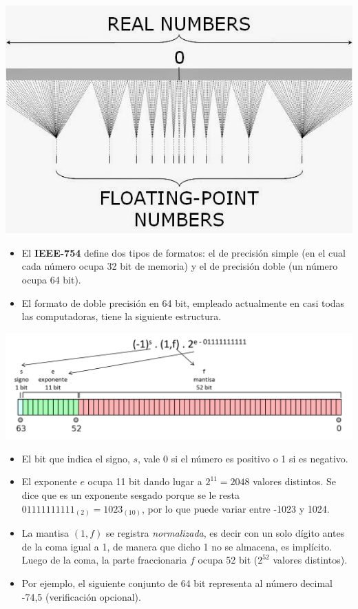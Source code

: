 \documentclass[]{book}
\providecommand{\tightlist}{%
  \setlength{\itemsep}{0pt}\setlength{\parskip}{0pt}}
\begin{document}
\begin{center}\includegraphics[width=0.5\linewidth]{Plots/U1/floatingPoint} \end{center}

\begin{itemize}
\tightlist
\item
  El \textbf{IEEE-754} define dos tipos de formatos: el de precisión simple (en el cual cada número ocupa 32 bit de memoria) y el de precisión doble (un número ocupa 64 bit).
\item
  El formato de doble precisión en 64 bit, empleado actualmente en casi todas las computadoras, tiene la siguiente estructura.
\end{itemize}

\begin{center}\includegraphics[width=0.9\linewidth]{Plots/U1/float64_2} \end{center}

\begin{itemize}
\item
  El bit que indica el signo, \(s\), vale 0 si el número es positivo o 1 si es negativo.
\item
  El exponente \(e\) ocupa 11 bit dando lugar a \(2^{11} = 2048\) valores distintos. Se dice que es un exponente sesgado porque se le resta \(01111111111_{(2)} = 1023_{(10)}\), por lo que puede variar entre -1023 y 1024.
\item
  La mantisa \((1,f)\) se registra \emph{normalizada}, es decir con un solo dígito antes de la coma igual a 1, de manera que dicho 1 no se almacena, es implícito. Luego de la coma, la parte fraccionaria \(f\) ocupa 52 bit (\(2^{52}\) valores distintos).
\item
  Por ejemplo, el siguiente conjunto de 64 bit representa al número decimal -74,5 (verificación opcional).
\end{itemize}
\end{document}
